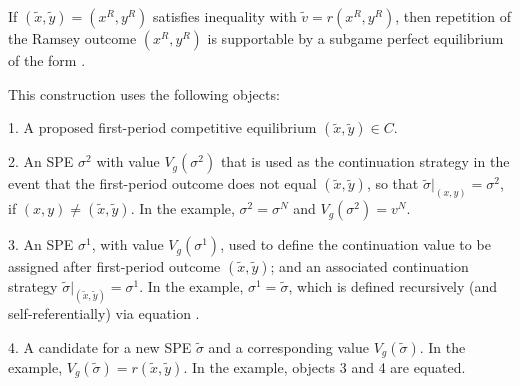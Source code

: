 


If $(\tilde x,\tilde y) = (x^R,y^R)$ satisfies inequality 
with $\tilde v = r(x^R,y^R)$, then repetition of the Ramsey outcome
$(x^R,y^R)$ is supportable by a subgame perfect equilibrium of the
form .

This construction uses the following objects:
\medskip
\item{1.} A proposed first-period competitive equilibrium $(\tilde x,\tilde y)\in C$.
\item{2.} An SPE $\sigma^2$ with value $V_g
(\sigma^2)$ that is used as the continuation strategy in the
event that the first-period outcome does not equal $(\tilde x,\tilde y)$,
so that $\tilde\sigma\vert_{(x,y)} = \sigma^2$, if $(x,y)\not=
(\tilde x,\tilde y)$.  In the example, $\sigma^2 = \sigma^N$ and
$V_g(\sigma^2) = v^N$.
\item{3.} An SPE $\sigma^1$, with value $V_g
(\sigma^1)$, used to define the continuation value to be assigned after
first-period outcome $(\tilde x,\tilde y)$;  and an associated  continuation strategy
$\tilde\sigma\vert_{(\tilde x,\tilde y)} = \sigma^1$.  In the
example, $\sigma^1 = \tilde \sigma$, which is defined recursively
(and self-referentially) via equation .
\item{4.} A candidate for a new  SPE  $\tilde\sigma$ and a corresponding value $V_g(\tilde \sigma)$.  In the example,
$V_g(\tilde \sigma) = r(\tilde x, \tilde y)$.
\medskip
In the example, objects 3 and 4 are equated.

